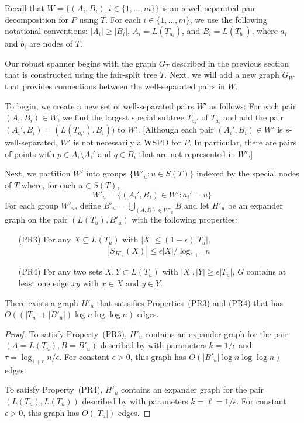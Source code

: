 \documentclass{patmorin}
\begin{document}
Recall that $W=\{(A_i,B_i):i\in\{1,\ldots,m\}\}$ is an $s$-well-separated
pair decomposition for $P$ using $T$. For each $i\in\{1,\ldots,m\}$,
we use the following notational conventions:  $|A_i|\ge |B_i|$,
$A_i=L(T_{a_i})$, and $B_i=L(T_{b_i})$, where $a_i$ and $b_i$ are nodes
of $T$.

Our robust spanner begins with the graph $G_T$ described in the
previous section that is constructed using the fair-split tree $T$.
Next, we will add a new graph $G_W$ that provides connections between
the well-separated pairs in $W$.

To begin, we create a new set of well-separated pairs $W'$ as follows:
For each pair $(A_i,B_i)\in W$, we find the largest special subtree
$T_{a_i'}$ of $T_{a_i}$ and add the pair $(A_i',B_i)=(L(T_{a_i'}),B_i))$
to $W'$.  [Although each pair $(A_i',B_i)\in W'$ is $s$-well-separated,
$W'$ is not necessarily a WSPD for $P$.  In particular, there are pairs
of points with $p\in A_i\setminus A_i'$ and $q\in B_i$ that
are not represented in $W'$.]

Next, we partition $W'$ into groups $\{W'_u: u\in S(T)\}$ indexed by
the special nodes of $T$ where, for each $u\in S(T)$,
\[
	W'_u = \{ (A_i',B_i)\in W' : a_i' = u \}
\]
For each group $W'_u$, define $B'_u=\bigcup_{(A,B)\in W'_u} B$
and let $H'_u$ be an expander graph on the pair $(L(T_u), B'_u)$ with
the following properties:
\begin{enumerate}
  \item[(PR3)] For any $X\subseteq L(T_u)$ with $|X|\le
  (1-\epsilon)|T_u|$, 
   \[ |S_{H'_u}(X)| \le \epsilon|X|/\log_{1+\epsilon} n \]
%
  \item[(PR4)] For any two sets $X,Y\subset L(T_u)$ with $|X|,|Y|\ge
  \epsilon|T_u|$, $G$ contains at least one edge $xy$ with $x\in X$
  and $y\in Y$.
\end{enumerate}

\begin{clm}
  There exists a graph $H'_u$ that satisifies Properties~(PR3) and (PR4)
  that has $O((|T_u|+|B'_u|)\log n\log\log n)$ edges.
\end{clm}

\begin{proof}
  To satisfy Property~(PR3), $H'_u$ contains an expander graph for the
  pair $(A=L(T_u),B=B'_u)$ described by  with parameters
  $k=1/\epsilon$ and $\tau=\log_{1+\epsilon} n/\epsilon$.  For constant
  $\epsilon >0$, this graph has $O(|B'_u|\log n\log\log n)$ edges.

  To satisfy Property~(PR4), $H'_u$ contains an expander graph for the
  pair $(L(T_u),L(T_u))$ described by  with parameters
  $k=\ell=1/\epsilon$.  For constant $\epsilon >0$, this graph has 
  $O(|T_u|)$ edges.
\end{proof}
\end{document}

